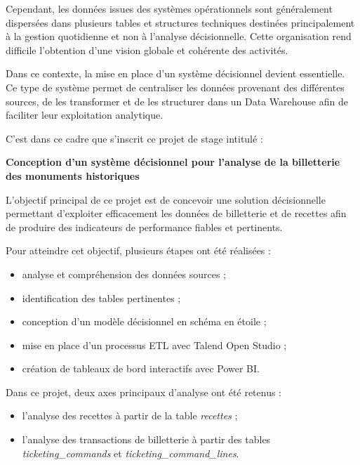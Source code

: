 \documentclass[12pt,a4paper]{report}
\begin{document}
	Cependant, les données issues des systèmes opérationnels sont généralement dispersées dans plusieurs tables et structures techniques destinées principalement à la gestion quotidienne et non à l’analyse décisionnelle. Cette organisation rend difficile l’obtention d’une vision globale et cohérente des activités.
	
	Dans ce contexte, la mise en place d’un système décisionnel devient essentielle. Ce type de système permet de centraliser les données provenant des différentes sources, de les transformer et de les structurer dans un Data Warehouse afin de faciliter leur exploitation analytique.
	
	C’est dans ce cadre que s’inscrit ce projet de stage intitulé :
	
	\begin{center}
		\textbf{\Large Conception d’un système décisionnel pour l’analyse de la billetterie des monuments historiques}
	\end{center}
	
	L’objectif principal de ce projet est de concevoir une solution décisionnelle permettant d’exploiter efficacement les données de billetterie et de recettes afin de produire des indicateurs de performance fiables et pertinents.
	
	Pour atteindre cet objectif, plusieurs étapes ont été réalisées :
	
	\begin{itemize}
		\item analyse et compréhension des données sources ;
		\item identification des tables pertinentes ;
		\item conception d’un modèle décisionnel en schéma en étoile ;
		\item mise en place d’un processus ETL avec Talend Open Studio ;
		\item création de tableaux de bord interactifs avec Power BI.
	\end{itemize}
	
	Dans ce projet, deux axes principaux d’analyse ont été retenus :
	
	\begin{itemize}
		\item l’analyse des recettes à partir de la table \textit{recettes} ;
		\item l’analyse des transactions de billetterie à partir des tables \textit{ticketing\_commands} et \textit{ticketing\_command\_lines}.
	\end{itemize}
	
\end{document}
